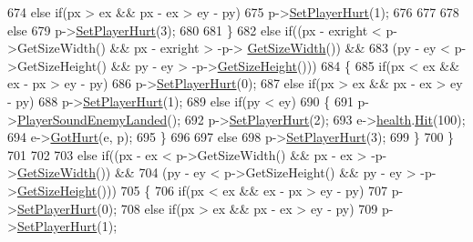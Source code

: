 \begin{DoxyCode}
674             \textcolor{keywordflow}{else} \textcolor{keywordflow}{if}(px > ex && px - ex > ey - py)
675                 p->\hyperlink{classPlayerObject_a632afc4f75ec8df95d81c2ae81a08a70}{SetPlayerHurt}(1);
676 
677 
678             \textcolor{keywordflow}{else}
679                 p->\hyperlink{classPlayerObject_a632afc4f75ec8df95d81c2ae81a08a70}{SetPlayerHurt}(3);
680 
681         \}
682         \textcolor{keywordflow}{else} \textcolor{keywordflow}{if}((px - exright < p->GetSizeWidth() && px - exright > -p->
      \hyperlink{classPlayerObject_ae6a6f078e01cf54d91108ecfa4e2da02}{GetSizeWidth}()) &&
683                 (py - ey < p->GetSizeHeight() && py - ey > -p->\hyperlink{classPlayerObject_a01be69eae2aad78c6e03ce6890179a22}{GetSizeHeight}()))
684         \{
685             \textcolor{keywordflow}{if}(px < ex &&  ex - px > ey - py)
686                 p->\hyperlink{classPlayerObject_a632afc4f75ec8df95d81c2ae81a08a70}{SetPlayerHurt}(0);
687             \textcolor{keywordflow}{else} \textcolor{keywordflow}{if}(px > ex && px - ex > ey - py)
688                 p->\hyperlink{classPlayerObject_a632afc4f75ec8df95d81c2ae81a08a70}{SetPlayerHurt}(1);
689             \textcolor{keywordflow}{else} \textcolor{keywordflow}{if}(py < ey)
690             \{
691                 p->\hyperlink{classPlayerObject_ad133797db4760e6ae229eb7889888a89}{PlayerSoundEnemyLanded}();
692                 p->\hyperlink{classPlayerObject_a632afc4f75ec8df95d81c2ae81a08a70}{SetPlayerHurt}(2);
693                 e->\hyperlink{classAI_a073d65bf0b0b08b31710cf9743d2e364}{health}.\hyperlink{classHealth_a565eec980a98122472e88c57e43b9f16}{Hit}(100);
694                 e->\hyperlink{classAIEnemies_a66cc890d3f5a49eee27432a13ccca93c}{GotHurt}(e, p);
695             \}
696 
697             \textcolor{keywordflow}{else}
698                 p->\hyperlink{classPlayerObject_a632afc4f75ec8df95d81c2ae81a08a70}{SetPlayerHurt}(3);
699         \}
700     \}
701 
702 
703     \textcolor{keywordflow}{else} \textcolor{keywordflow}{if}((px - ex < p->GetSizeWidth() && px - ex > -p->\hyperlink{classPlayerObject_ae6a6f078e01cf54d91108ecfa4e2da02}{GetSizeWidth}()) &&
704             (py - ey < p->GetSizeHeight() && py - ey > -p->\hyperlink{classPlayerObject_a01be69eae2aad78c6e03ce6890179a22}{GetSizeHeight}()))
705     \{
706         \textcolor{keywordflow}{if}(px < ex &&  ex - px > ey - py)
707             p->\hyperlink{classPlayerObject_a632afc4f75ec8df95d81c2ae81a08a70}{SetPlayerHurt}(0);
708         \textcolor{keywordflow}{else} \textcolor{keywordflow}{if}(px > ex && px - ex > ey - py)
709             p->\hyperlink{classPlayerObject_a632afc4f75ec8df95d81c2ae81a08a70}{SetPlayerHurt}(1);

\end{DoxyCode}
